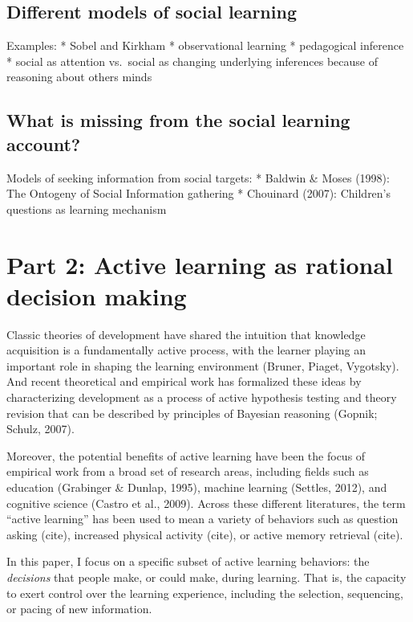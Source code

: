 \documentclass[a4paper,man,apacite,floatsintext]{apa6}
\begin{document}
\subsection{Different models of social
learning}\label{different-models-of-social-learning}

Examples: * Sobel and Kirkham * observational learning * pedagogical
inference * social as attention vs.~social as changing underlying
inferences because of reasoning about others minds

\subsection{What is missing from the social learning
account?}\label{what-is-missing-from-the-social-learning-account}

Models of seeking information from social targets: * Baldwin \& Moses
(1998): The Ontogeny of Social Information gathering * Chouinard (2007):
Children's questions as learning mechanism

\section{Part 2: Active learning as rational decision
making}\label{part-2-active-learning-as-rational-decision-making}

Classic theories of development have shared the intuition that knowledge
acquisition is a fundamentally active process, with the learner playing
an important role in shaping the learning environment (Bruner, Piaget,
Vygotsky). And recent theoretical and empirical work has formalized
these ideas by characterizing development as a process of active
hypothesis testing and theory revision that can be described by
principles of Bayesian reasoning (Gopnik; Schulz, 2007).

Moreover, the potential benefits of active learning have been the focus
of empirical work from a broad set of research areas, including fields
such as education (Grabinger \& Dunlap, 1995), machine learning
(Settles, 2012), and cognitive science (Castro et al., 2009). Across
these different literatures, the term ``active learning'' has been used
to mean a variety of behaviors such as question asking (cite), increased
physical activity (cite), or active memory retrieval (cite).

In this paper, I focus on a specific subset of active learning
behaviors: the \emph{decisions} that people make, or could make, during
learning. That is, the capacity to exert control over the learning
experience, including the selection, sequencing, or pacing of new
information.
\end{document}
